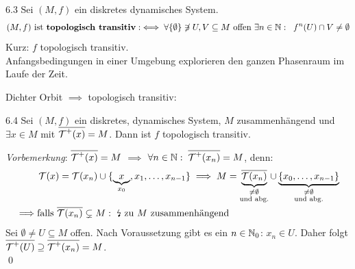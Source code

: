 \documentclass[a4paper]{article}
\begin{document}
\begin{Def}{}{6.3}
Sei $(M,f)$ ein diskretes dynamisches System.
\[(M,f)\text{ ist }\textbf{topologisch transitiv}:\iff  \forall \{\emptyset\}\not\ni U,V\subseteq M \text{ offen } \exists n\in\operatorname{\mathbb N}:\;\;f^n(U)\cap V\ne\emptyset\]
Kurz: $f$ topologisch transitiv.\\
\glqq Anfangsbedingungen in einer Umgebung explorieren den \glq{}ganzen\grq{} Phasenraum im Laufe der Zeit.\grqq
\end{Def}

Dichter Orbit $\implies$ topologisch transitiv:

\begin{Lemma}{}{6.4}
Sei $(M,f)$ ein diskretes, dynamisches System, $M$ zusammenhängend und $\exists x\in M$ mit $\overline{\operatorname{\mathcal{T}}^+(x)}=M$. Dann ist $f$ topologisch transitiv.
\end{Lemma}

\begin{Beweis}
\textit{Vorbemerkung}: $\overline{\operatorname{\mathcal{T}}^+(x)}=M$ $\implies$ $\forall n\in\operatorname{\mathbb N}:\;\overline{\operatorname{\mathcal{T}}^+(x_n)}=M$, denn:
\begin{align*}
&\operatorname{\mathcal{T}}(x)=\operatorname{\mathcal{T}}(x_n)\cup\{\underbrace{x}_{x_0},x_1,\ldots,x_{n-1}\}\implies M=\underbrace{\overline{\operatorname{\mathcal{T}}(x_n)}}_{\substack{\ne\emptyset\\\text{und abg.}}}\cup \underbrace{\{x_0,\ldots,x_{n-1}\}}_{\substack{\ne\emptyset\\\text{und abg.}}}\\
\implies& \text{falls }\overline{\operatorname{\mathcal{T}}(x_n)}\subsetneq M:\text{ \lightning{} zu } M\text{ zusammenhängend}
\end{align*}
 Sei $\emptyset \ne U\subseteq M$ offen. Nach Voraussetzung gibt es ein $n\in\operatorname{\mathbb N}_0$: $x_n\in U$. Daher folgt $\overline{\operatorname{\mathcal{T}}^+(U)}\supseteq \overline{\operatorname{\mathcal{T}}^+(x_n)}=M$.\\\qed
\end{Beweis}
\end{document}
